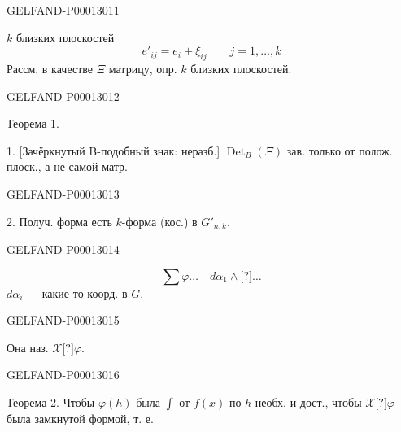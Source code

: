 \begin{GelfandAdjacentEvidence}{GELFAND-P000130}{11}

$k$ близких плоскостей
\begin{equation*}e'_{ij}=e_i+\xi_{ij}\qquad j=1,\ldots,k\end{equation*}
Рассм. в качестве $\Xi$ матрицу, опр. $k$ близких плоскостей.
\end{GelfandAdjacentEvidence}
\begin{GelfandAdjacentEvidence}{GELFAND-P000130}{12}

\underline{Теорема 1.}

1. [Зачёркнутый B-подобный знак: неразб.] $\operatorname{Det}_B(\Xi)$ зав. только от полож. плоск., а не самой матр.
\end{GelfandAdjacentEvidence}
\begin{GelfandAdjacentEvidence}{GELFAND-P000130}{13}

2. Получ. форма есть $k$-форма (кос.) в $G'_{n,k}$.
\end{GelfandAdjacentEvidence}
\begin{GelfandAdjacentEvidence}{GELFAND-P000130}{14}

\begin{equation*}\sum\varphi\ldots\quad d\alpha_1\wedge\text{[?]}\ldots\end{equation*}
$d\alpha_i$ --- какие-то коорд. в $G$.
\end{GelfandAdjacentEvidence}
\begin{GelfandAdjacentEvidence}{GELFAND-P000130}{15}

Она наз. $\mathcal X\text{[?]}\varphi$.
\end{GelfandAdjacentEvidence}
\begin{GelfandAdjacentEvidence}{GELFAND-P000130}{16}

\underline{Теорема 2.} Чтобы $\varphi(h)$ была $\int$ от $f(x)$ по $h$ необх. и дост., чтобы $\mathcal X\text{[?]}\varphi$ была замкнутой формой, т. е.
\end{GelfandAdjacentEvidence}
